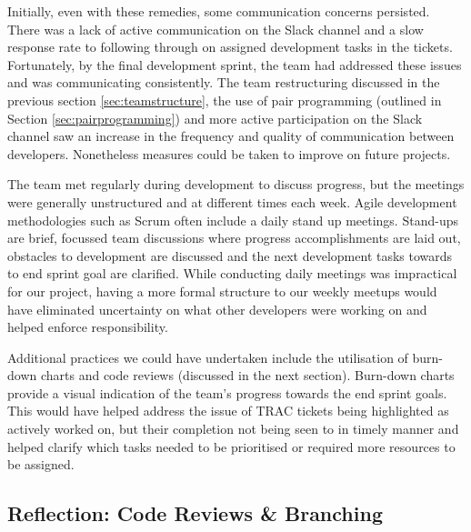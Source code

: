 \documentclass{l3proj}
\begin{document}
Initially, even with these remedies, some communication concerns persisted. There was a lack of active communication on the Slack channel and a slow response rate to following through on assigned development tasks in the tickets. Fortunately, by the final development sprint, the team had addressed these issues and was communicating consistently. The team restructuring discussed in the previous section \ref{sec:teamstructure}, the use of pair programming (outlined in Section \ref{sec:pairprogramming}) and more active participation on the Slack channel saw an increase in the frequency and quality of communication between developers. Nonetheless measures could be taken to improve on future projects.

The team met regularly during development to discuss progress, but the meetings were generally unstructured and at different times each week. Agile development methodologies such as Scrum often include a daily stand up meetings. Stand-ups are brief, focussed team discussions where progress accomplishments are laid out, obstacles to development are discussed and the next development tasks towards to end sprint goal are clarified. While conducting daily meetings was impractical for our project, having a more formal structure to our weekly meetups would have eliminated uncertainty on what other developers were working on and helped enforce responsibility. 

Additional practices we could have undertaken include the utilisation of burn-down charts and code reviews (discussed in the next section). Burn-down charts provide a visual indication of the team’s progress towards the end sprint goals. This would have helped address the issue of TRAC tickets being highlighted as actively worked on, but their completion not being seen to in timely manner and helped clarify which tasks needed to be prioritised or required more resources to be assigned. 


\subsection{Reflection: Code Reviews \& Branching}
\label{sec:codereviewbranch}
\end{document}
